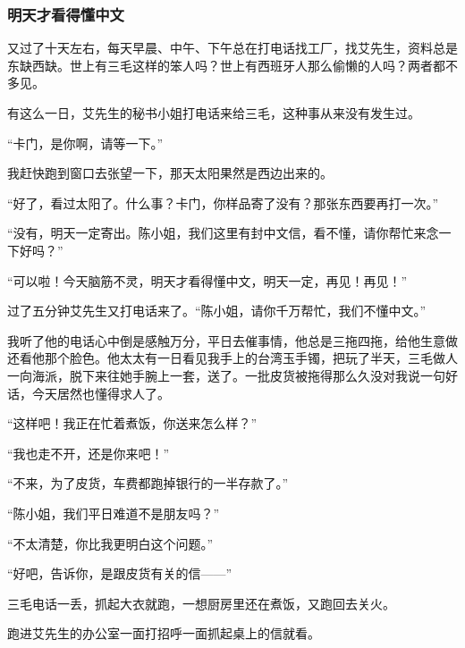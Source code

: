 \subsubsection*{明天才看得懂中文}
\par 又过了十天左右，每天早晨、中午、下午总在打电话找工厂，找艾先生，资料总是东缺西缺。世上有三毛这样的笨人吗？世上有西班牙人那么偷懒的人吗？两者都不多见。
\par 有这么一日，艾先生的秘书小姐打电话来给三毛，这种事从来没有发生过。
\par “卡门，是你啊，请等一下。”
\par 我赶快跑到窗口去张望一下，那天太阳果然是西边出来的。
\par “好了，看过太阳了。什么事？卡门，你样品寄了没有？那张东西要再打一次。”
\par “没有，明天一定寄出。陈小姐，我们这里有封中文信，看不懂，请你帮忙来念一下好吗？”
\par “可以啦！今天脑筋不灵，明天才看得懂中文，明天一定，再见！再见！”
\par 过了五分钟艾先生又打电话来了。“陈小姐，请你千万帮忙，我们不懂中文。”
\par 我听了他的电话心中倒是感触万分，平日去催事情，他总是三拖四拖，给他生意做还看他那个脸色。他太太有一日看见我手上的台湾玉手镯，把玩了半天，三毛做人一向海派，脱下来往她手腕上一套，送了。一批皮货被拖得那么久没对我说一句好话，今天居然也懂得求人了。
\par “这样吧！我正在忙着煮饭，你送来怎么样？”
\par “我也走不开，还是你来吧！”
\par “不来，为了皮货，车费都跑掉银行的一半存款了。”
\par “陈小姐，我们平日难道不是朋友吗？”
\par “不太清楚，你比我更明白这个问题。”
\par “好吧，告诉你，是跟皮货有关的信——”
\par 三毛电话一丢，抓起大衣就跑，一想厨房里还在煮饭，又跑回去关火。
\par 跑进艾先生的办公室一面打招呼一面抓起桌上的信就看。
